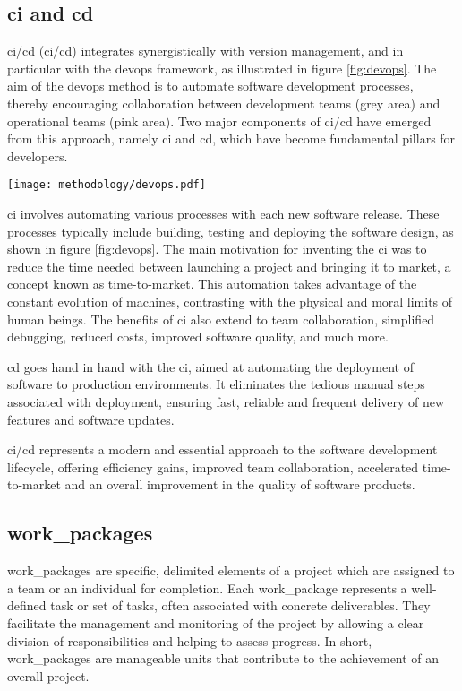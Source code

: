 \subsection{\acrfull{ci} and \acrfull{cd}}
\acrshort{ci}/\acrshort{cd} (\acrlong{ci}/\acrlong{cd}) integrates synergistically with version management, and in particular with the \acrshort{devops} framework, as illustrated in figure \ref{fig:devops}. The aim of the \acrshort{devops} method is to automate software development processes, thereby encouraging collaboration between development teams (grey area) and operational teams (pink area). Two major components of \acrshort{ci}/\acrshort{cd} have emerged from this approach, namely \acrfull{ci} and \acrfull{cd}, which have become fundamental pillars for developers.
\begin{center}
    \begingroup
    \texttt{[image: methodology/devops.pdf]}
    \label{fig:devops}
    \endgroup
\end{center}
\acrshort{ci} involves automating various processes with each new software release. These processes typically include building, testing and deploying the software design, as shown in figure \ref{fig:devops}. The main motivation for inventing the \acrshort{ci} was to reduce the time needed between launching a project and bringing it to market, a concept known as time-to-market. This automation takes advantage of the constant evolution of machines, contrasting with the physical and moral limits of human beings. The benefits of \acrshort{ci} also extend to team collaboration, simplified debugging, reduced costs, improved software quality, and much more.

\acrshort{cd} goes hand in hand with the \acrshort{ci}, aimed at automating the deployment of software to production environments. It eliminates the tedious manual steps associated with deployment, ensuring fast, reliable and frequent delivery of new features and software updates.

\acrshort{ci}/\acrshort{cd} represents a modern and essential approach to the software development lifecycle, offering efficiency gains, improved team collaboration, accelerated time-to-market and an overall improvement in the quality of software products.

\subsection{\Glspl{work_package}}
\Glspl{work_package} are specific, delimited elements of a project which are assigned to a team or an individual for completion. Each \gls{work_package} represents a well-defined task or set of tasks, often associated with concrete deliverables. They facilitate the management and monitoring of the project by allowing a clear division of responsibilities and helping to assess progress. In short, \glspl{work_package} are manageable units that contribute to the achievement of an overall project.

